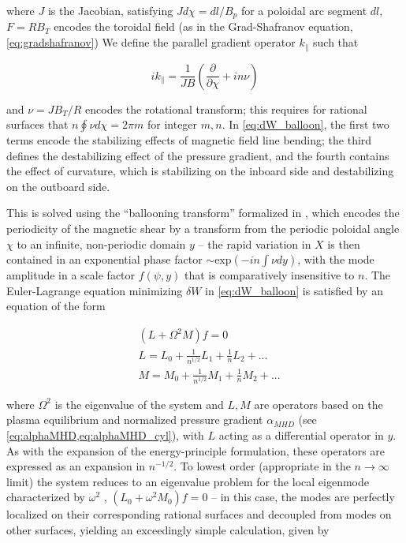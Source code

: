 \noindent where $J$ is the Jacobian, satisfying $J d\chi = dl/B_p$ for a poloidal arc segment $dl$, $F = RB_T$ encodes the toroidal field (as in the Grad-Shafranov equation, \cref{eq:gradshafranov}) We define the parallel gradient operator $k_\parallel$ such that

\begin{equation}\label{eq:dW_kparallel}
  ik_\parallel = \frac{1}{JB} \left( \frac{\partial}{\partial \chi} + in \nu \right)
\end{equation}

\noindent and $\nu = JB_T/R$ encodes the rotational transform; this requires for rational surfaces that $n \oint \nu d\chi = 2\pi m$ for integer $m,n$.  In \cref{eq:dW_balloon}, the first two terms encode the stabilizing effects of magnetic field line bending; the third defines the destabilizing effect of the pressure gradient, and the fourth contains the effect of curvature, which is stabilizing on the inboard side and destabilizing on the outboard side.  

This is solved using the ``ballooning transform'' formalized in \cite{Connor1978}, which encodes the periodicity of the magnetic shear by a transform from the periodic poloidal angle $\chi$ to an infinite, non-periodic domain $y$ -- the rapid variation in $X$ is then contained in an exponential phase factor $\sim \mbox{exp}(-in\int \nu dy)$, with the mode amplitude in a scale factor $f(\psi,y)$ that is comparatively insensitive to $n$.  The Euler-Lagrange equation minimizing $\delta W$ in \cref{eq:dW_balloon} is satisfied by an equation of the form

\begin{equation}\label{eq:baloo}
 \begin{aligned}
  &\left( L + \Omega^2 M \right) f = 0\\
  &L = L_0 + \frac{1}{n^{1/2}} L_1 + \frac{1}{n} L_2 + ...\\
  &M = M_0 + \frac{1}{n^{1/2}} M_1 + \frac{1}{n} M_2 + ...
 \end{aligned}
\end{equation}

\noindent where $\Omega^2$ is the eigenvalue of the system and $L,M$ are operators based on the plasma equilibrium and normalized pressure gradient $\alpha_{MHD}$ (see \cref{eq:alphaMHD,eq:alphaMHD_cyl}), with $L$ acting as a differential operator in $y$.  As with the expansion of the energy-principle formulation, these operators are expressed as an expansion in $n^{-1/2}$.  To lowest order (appropriate in the $n \rightarrow \infty$ limit) the system reduces to an eigenvalue problem for the local eigenmode characterized by $\omega^2$ \cite{Connor1979}, $(L_0 + \omega^2 M_0)f = 0$ -- in this case, the modes are perfectly localized on their corresponding rational surfaces and decoupled from modes on other surfaces, yielding an exceedingly simple calculation, given by

